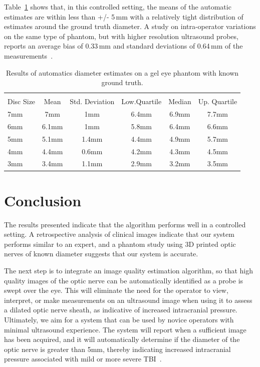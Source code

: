 \documentclass{llncs}
\begin{document}
Table~\ref{tab:phantom} shows that, in this controlled setting, the means of the
automatic estimates are within less than +/- 5\,mm with a relatively tight
distribution of estimates around the ground truth diameter. A study on
intra-operator variations on the same type of phantom, but with higher
resolution ultrasound probes, reports an average bias of 0.33\,mm and standard
deviations of 0.64\,mm of the measurements~\cite{Jo2016}.  
\begin{table}
\centering
\caption{
Results of automatics diameter estimates on a gel eye phantom with known ground truth.
}
\label{tab:phantom}
\begin{tabular}{l|cc|ccc}
\\[-2.8ex] 
\hline  
\hline 
\\[-1.8ex]
Disc Size & Mean & Std. Deviation & Low.Quartile & Median & Up. Quartile \\
\hline
7mm & 7mm   & 1mm   & 6.4mm & 6.9mm & 7.7mm \\
6mm & 6.1mm & 1mm   & 5.8mm & 6.4mm & 6.6mm \\
5mm & 5.1mm & 1.4mm & 4.4mm & 4.9mm & 5.7mm \\
4mm & 4.4mm & 0.6mm & 4.2mm & 4.3mm & 4.5mm \\
3mm & 3.4mm & 1.1mm & 2.9mm & 3.2mm & 3.5mm \\
\hline 
\end{tabular}
\end{table}

\section{Conclusion}
The results presented indicate that the algorithm performs well in a controlled
setting.  A retrospective analysis of clinical images indicate that our system
performs similar to an expert, and a phantom study using 3D printed optic
nerves of known diameter suggests that our system is accurate.

The next step is to integrate an image quality estimation algorithm, so that
high quality images of the optic nerve can be automatically identified as a
probe is swept over the eye. This will eliminate the need for the operator to
view, interpret, or make measurements on an ultrasound image when using it to
assess a dilated optic nerve sheath, as indicative of increased intracranial
pressure. Ultimately, we aim for a system that can be used by novice operators
with minimal ultrasound experience. The system will report when a sufficient
image has been acquired, and it will automatically determine if the diameter of
the optic nerve is greater than 5mm, thereby indicating increased intracranial
pressure associated with mild or more severe TBI~\cite{Ma2015}.
\end{document}
